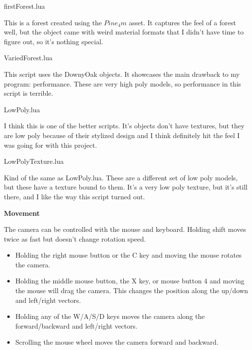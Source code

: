 \documentclass[10pt]{article}
\begin{document}
	\begin{center}
		firstForest.lua
	\end{center}
	
	This is a forest created using the $Pine_4m$ asset. It captures the feel of a forest well, but the object came with weird material formats that I didn't have time to figure out, so it's nothing special.
	
	\begin{center}
		VariedForest.lua
	\end{center}
	
	This script uses the DownyOak objects. It showcases the main drawback to my program: performance. These are very high poly models, so performance in this script is terrible.
	
	\begin{center}
		LowPoly.lua
	\end{center}
	
	I think this is one of the better scripts. It's objects don't have textures, but they are low poly because of their stylized design and I think definitely hit the feel I was going for with this project.
	
	\begin{center}
		LowPolyTexture.lua
	\end{center}
	
	Kind of the same as LowPoly.lua. These are a different set of low poly models, but these have a texture bound to them. It's a very low poly texture, but it's still there, and I like the way this script turned out.
	
	\begin{center}
		\bf Movement
	\end{center}
	The camera can be controlled with the mouse and keyboard. Holding shift moves twice as fast but doesn't change rotation speed.
	
	\begin{itemize}
		\item Holding the right mouse button or the C key and moving the mouse rotates the camera.
		\item Holding the middle mouse button, the X key, or mouse button 4 and moving the mouse will drag the camera. This changes the position along the up/down and left/right vectors.
		\item Holding any of the W/A/S/D keys moves the camera along the forward/backward and left/right vectors.
		\item Scrolling the mouse wheel moves the camera forward and backward.
	\end{itemize}
	
\end{document}
